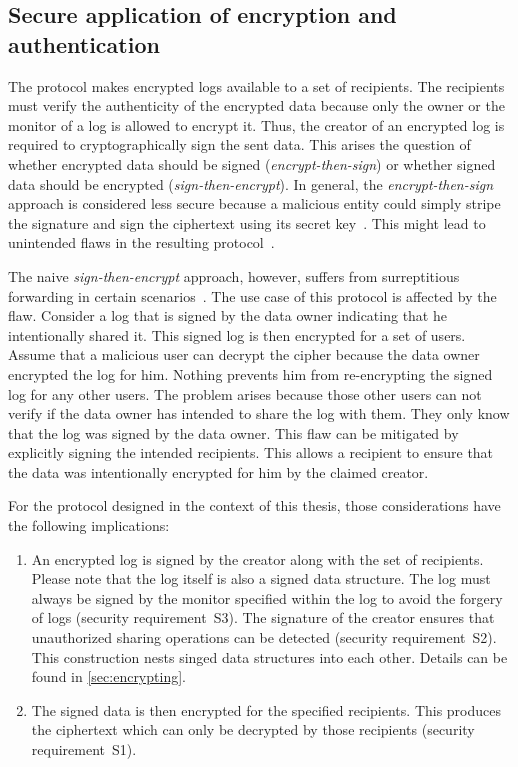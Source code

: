 \documentclass[../main.tex]{subfiles}
\begin{document}
\subsection{Secure application of encryption and authentication}
\label{sec:sign-and-encrypt}
The protocol makes encrypted logs available to a set of recipients.
The recipients must verify the authenticity of the encrypted data because only the owner or the monitor of a log is allowed to encrypt it.
Thus, the creator of an encrypted log is required to cryptographically sign the sent data.
This arises the question of whether encrypted data should be signed (\emph{encrypt-then-sign}) or whether signed data should be encrypted (\emph{sign-then-encrypt}).
In general, the \emph{encrypt-then-sign} approach is considered less secure because a malicious entity could simply stripe the signature and sign the ciphertext using its secret key~\cite{Davis2001}.
This might lead to unintended flaws in the resulting protocol~\cite{JWT2015}.

The naive \emph{sign-then-encrypt} approach, however, suffers from surreptitious forwarding in certain scenarios~\cite{Davis2001}.
The use case of this protocol is affected by the flaw.
Consider a log that is signed by the data owner indicating that he intentionally shared it.
This signed log is then encrypted for a set of users.
Assume that a malicious user can decrypt the cipher because the data owner encrypted the log for him.
Nothing prevents him from re-encrypting the signed log for any other users.
The problem arises because those other users can not verify if the data owner has intended to share the log with them.
They only know that the log was signed by the data owner.
This flaw can be mitigated by explicitly signing the intended recipients.
This allows a recipient to ensure that the data was intentionally encrypted for him by the claimed creator.~\cite{Davis2001}

For the protocol designed in the context of this thesis, those considerations have the following implications:
\begin{enumerate}
    \item 
    An encrypted log is signed by the creator along with the set of recipients.
    Please note that the log itself is also a signed data structure.
    The log must always be signed by the monitor specified within the log to avoid the forgery of logs (security requirement~S3).
    The signature of the creator ensures that unauthorized sharing operations can be detected (security requirement~S2).
    This construction nests singed data structures into each other.
    Details can be found in \cref{sec:encrypting}.
    \item 
    The signed data is then encrypted for the specified recipients.
    This produces the ciphertext which can only be decrypted by those recipients (security requirement~S1).
\end{enumerate}
\end{document}
